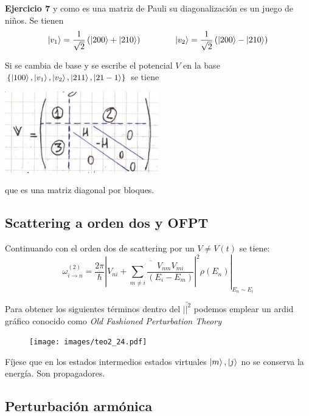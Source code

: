 \documentclass[10pt,oneside]{CBFT_book}
\begin{document}
\begin{ejemplo}{\bf Ejercicio 7}
y como es una matriz de Pauli su diagonalización es un juego de niños. Se tienen
\[
	\Ket{v_1} = \frac{1}{\sqrt{2}} \left( \Ket{200} + \Ket{210} \right)
	\qquad \qquad 
	\Ket{v_2} = \frac{1}{\sqrt{2}} \left( \Ket{200} - \Ket{210} \right)
\]

Si se cambia de base y se escribe el potencial $V$ en la base $\{ \Ket{100}, \Ket{v_1}, 
\Ket{v_2}, \Ket{211}, \Ket{21-1} \}$ se tiene

\includegraphics[width=0.5\textwidth]{images/fig_ft2_ejercicio7C.jpg}

que es una matriz diagonal por bloques. 
 
\end{ejemplo}

\subsection{Scattering a orden dos y OFPT}

Continuando con el orden dos de scattering por un $V\neq V(t)$ se tiene:
\[
	\omega_{i\to n}^{(2)} = \frac{2\pi}{\hbar}\left. \left| \overline{ V_{ni} + \sum_{m\neq i} 
	\frac{V_{nm}V_{mi}}{(E_i-E_m)}} \right|^2 \rho(E_n) \right|_{E_n\sim E_i}
\]

Para obtener los siguientes términos dentro del $\bar{||^2}$ podemos emplear un ardid gráfico conocido como 
{\it Old Fashioned Perturbation Theory}

\begin{figure}[!thb]
	\begin{center}
	\texttt{[image: images/teo2\_24.pdf]}
	\end{center}
	\caption{}
\end{figure} 


Fíjese que en los estados intermedios estados virtuales $\Ket{m},\Ket{j}$ no se conserva la energía. Son 
propagadores.


\subsection{Perturbación armónica}
\end{document}
